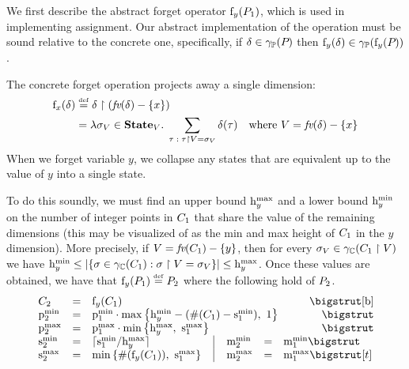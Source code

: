 We first describe the abstract forget operator $\mathrm{f}_{y}(P_{1})$,
which is used in implementing assignment. Our abstract implementation
of the operation must be sound relative to the concrete one,
specifically, if $\delta \in \gamma_{\mathbb{P}}(P_{})$ then $\mathrm{f}_{y}(\delta)
\in \gamma_{\mathbb{P}}(\mathrm{f}_{y}(P_{}))$.

The concrete forget operation projects away a single dimension:
\begin{align*}
\mathrm{f}_{x}(\delta)
  & \stackrel{\smash{\scriptscriptstyle \mathrm{def}}}= \delta \upharpoonright \left( \textit{fv}(\delta) - \left\{ x \right\} \right) \\
  & = \lambda \sigma_V \in \textbf{State}_V . \; \sum_{\tau \;:\;
  \tau \upharpoonright V = \sigma_V} \delta(\tau) & \text{where $ V
= \textit{fv}(\delta) - \left\{ x \right\} $}
\end{align*}
When we forget variable $y$, we collapse any states that are
equivalent up to the value of $y$ into a single state.

To do this soundly, we must find an upper bound
$\mathrm{h}^\mathrm{max}_{y}$ and a lower bound $\mathrm{h}^\mathrm{min}_{y}$ on the number of integer
points in $ C_{1}$ that share the value of the remaining
dimensions (this may be visualized of as the min and max height of
$C_{1}$ in the $y$ dimension). More precisely, if $ V =
\textit{fv}(C_{1}) - \left\{ y \right\} $, then for every $ \sigma_V \in
\gamma_{\mathbb{C}}(C_{1} \upharpoonright V) $ we have $ \mathrm{h}^\mathrm{min}_{y} \leq
\left| \left\{ \sigma \in \gamma_{\mathbb{C}}(C_{1}): \sigma \upharpoonright V =
    \sigma_V \right\} \right| \leq \mathrm{h}^\mathrm{max}_{y} $.  Once these values are obtained, we
have that $\mathrm{f}_{y}(P_{1}) \stackrel{\smash{\scriptscriptstyle \mathrm{def}}}= P_{2}$ where the following hold
of $P_{2}$.
\[
\begin{array}{lcl@{\hspace{0.4cm}}|@{\hspace{0.4cm}}lcl}
\poly_2 &=& \multicolumn{4}{l}{\forget{y}{\poly_1}} \bigstrut[b] \\
\pmin{2} &=& \multicolumn{4}{l}{\pmin{1} \cdot \maxparen{\minh{y}-(\psize{\poly_1} - \smin{1}),\ 1}} \bigstrut \\
\pmax{2} &=& \multicolumn{4}{l}{\pmax{1} \cdot \minparen{\maxh{y},\ \smax{1}}} \bigstrut \\
\smin{2} &=& \lceil{\smin{1} / \maxh{y}}\rceil &
  \mmin{2} &=& \mmin{1} \bigstrut \\
\smax{2} &=& \minparen{\psize{\forget{y}{\poly_1}},\ \smax{1}} &
  \mmax{2} &=& \mmax{1} \bigstrut[t]
\end{array}
\]

